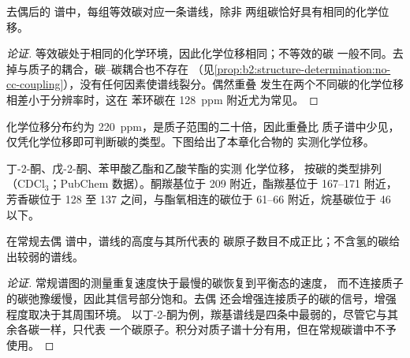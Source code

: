 \begin{proposition}[谱线数目]\label{prop:b2:structure-determination:signals}
去偶后的  谱中，每组等效碳对应一条谱线，除非
两组碳恰好具有相同的化学位移。
\end{proposition}

\begin{proof}[论证]
等效碳处于相同的化学环境，因此化学位移相同；不等效的碳
一般不同。去掉与质子的耦合，碳–碳耦合也不存在
（见\cref{prop:b2:structure-determination:no-cc-coupling}），没有任何因素使谱线裂分。偶然重叠
发生在两个不同碳的化学位移相差小于分辨率时，这在
苯环碳在 \qty{128}{ppm} 附近尤为常见。
\end{proof}

化学位移分布约为 \qty{220}{ppm}，是质子范围的二十倍，因此重叠比
质子谱中少见，仅凭化学位移即可判断碳的类型。下图给出了本章化合物的
实测化学位移。

\begin{omfigure}

{\small 丁-2-酮、戊-2-酮、苯甲酸乙酯和乙酸苄酯的实测  化学位移，
按碳的类型排列（CDCl$_3$；PubChem 数据）。酮羰基位于 209 附近，酯羰基位于
167--171 附近，芳香碳位于 128 至 137 之间，与酯氧相连的碳位于
61--66 附近，烷基碳位于 46 以下。}
\end{omfigure}

\begin{proposition}[谱线高度不代表计数]\label{prop:b2:structure-determination:intensities}
在常规去偶  谱中，谱线的高度与其所代表的
碳原子数目不成正比；不含氢的碳给出较弱的谱线。
\end{proposition}

\begin{proof}[论证]
常规谱图的测量重复速度快于最慢的碳恢复到平衡态的速度，
而不连接质子的碳弛豫缓慢，因此其信号部分饱和。去偶
还会增强连接质子的碳的信号，增强程度取决于其周围环境。
以丁-2-酮为例，羰基谱线是四条中最弱的，尽管它与其余各碳一样，只代表
一个碳原子。积分对质子谱十分有用，但在常规碳谱中不予使用。
\end{proof}


